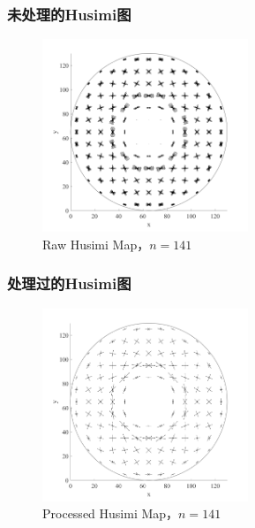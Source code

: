 \documentclass[UTF8]{beamer}
\begin{document}
\begin{frame}
    \frametitle{未处理的Husimi图}
    \begin{figure}
        \centering
        \includegraphics[width = 0.55\textwidth]{../images/figure/141_h_HusimiMap.png}
        \caption{Raw Husimi Map，$n=141$}
    \end{figure} 
\end{frame}

\begin{frame}
    \frametitle{处理过的Husimi图}
    \begin{figure}
        \centering
        \includegraphics[width = 0.55\textwidth]{../images/figure/141_h_pHusimiMap.png}
        \caption{Processed Husimi Map，$n=141$}
    \end{figure} 
\end{frame}
\end{document}
